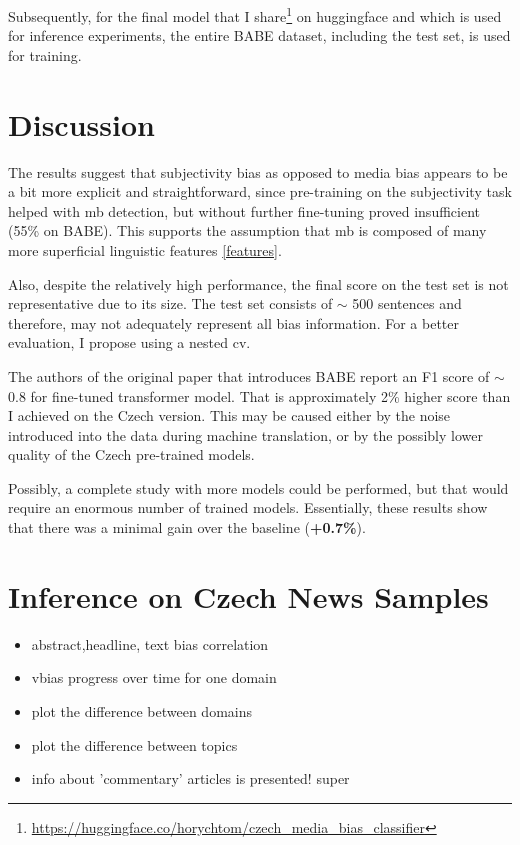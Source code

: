 Subsequently, for the final model that I share\footnote{\url{https://huggingface.co/horychtom/czech_media_bias_classifier}} on huggingface and which is used for inference experiments, the entire BABE dataset, including the test set, is used for training.

\section{Discussion}
The results suggest that subjectivity bias as opposed to media bias appears to be a bit more explicit and straightforward, since pre-training on the subjectivity task helped with \gls{mb} detection, but without further fine-tuning proved insufficient (55\% on BABE). This supports the assumption that \gls{mb} is composed of many more superficial linguistic features \ref{features}.

Also, despite the relatively high performance, the final score on the test set is not representative due to its size. The test set consists of $\sim$ 500 sentences and therefore, may not adequately represent all bias information. For a better evaluation, I propose using a nested \gls{cv}.

The authors of the original paper that introduces BABE \cite{spinde2021neural} report an F1 score of $\sim$ 0.8 for fine-tuned transformer model. That is approximately 2\% higher score than I achieved on the Czech version. This may be caused either by the noise introduced into the data during machine translation, or by the possibly lower quality of the Czech pre-trained models.

Possibly, a complete study with more models could be performed, but that would require an enormous number of trained models. Essentially, these results show that there was a minimal gain over the baseline (\textbf{+0.7\%}).







\newpage

\section{Inference on Czech News Samples}\label{inference}

\begin{itemize}
    \item abstract,headline, text bias correlation
    \item vbias progress over time for one domain
    \item plot the difference between domains
    \item plot the difference between topics
    \item info about 'commentary' articles is presented! super
\end{itemize}

